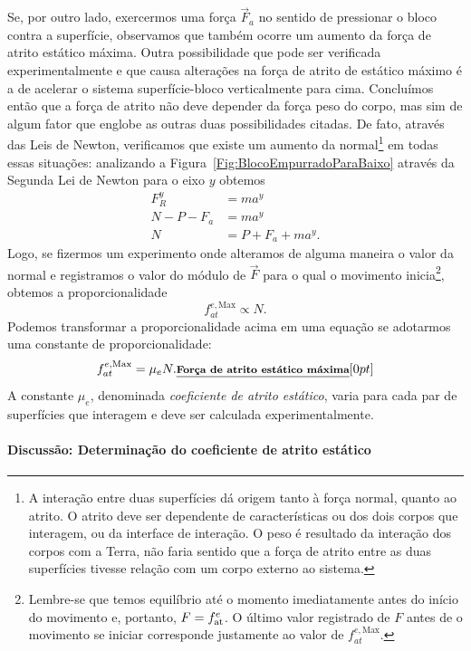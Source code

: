 Se, por outro lado, exercermos uma força $\vec{F}_a$ no sentido de pressionar o bloco contra a superfície, observamos que também ocorre um aumento da força de atrito estático máxima. Outra possibilidade que pode ser verificada experimentalmente e que causa alterações na força de atrito de estático máximo é a de acelerar o sistema superfície-bloco verticalmente para cima. Concluímos então que a força de atrito não deve depender da força peso do corpo, mas sim de algum fator que englobe as outras duas possibilidades citadas. De fato, através das Leis de Newton, verificamos  que existe um aumento da normal\footnote{A interação entre duas superfícies dá origem tanto à força normal, quanto ao atrito. O atrito deve ser dependente de características ou dos dois corpos que interagem, ou da interface de interação. O peso é resultado da interação dos corpos com a Terra, não faria sentido que a força de atrito entre as duas superfícies tivesse relação com um corpo externo ao sistema.} em todas essas situações: analizando a Figura~\ref{Fig:BlocoEmpurradoParaBaixo} através da Segunda Lei de Newton para o eixo $y$ obtemos
\begin{align}
    F_R^y &= m a^y \\
    N - P - F_a &= m a^y \\
    N &= P + F_a + m a^y.
\end{align}
%
Logo, se fizermos um experimento onde alteramos de alguma maneira o valor da normal e registramos o valor do módulo de $\vec{F}$ para o qual o movimento inicia\footnote{Lembre-se que temos equilíbrio até o momento imediatamente antes do início do movimento e, portanto, $F = f_{\rm{at}}^e$. O último valor registrado de $F$ antes de o movimento se iniciar corresponde justamente ao valor de $f_{at}^{e,\textrm{Max}}$.}, obtemos a proporcionalidade
\begin{equation}
    f_{at}^{e,\textrm{Max}} \propto N.
\end{equation}
%
Podemos transformar a proporcionalidade acima em uma equação se adotarmos uma constante de proporcionalidade:
\begin{equation}
    f_{at}^{e,\textrm{Max}} = \mu_e N. \relax{\footnotesize\emph{\textbf{Força de atrito estático máxima}}}[0pt]
\end{equation}
%
A constante $\mu_e$, denominada \emph{coeficiente de atrito estático}, varia para cada par de superfícies que interagem e deve ser calculada experimentalmente.

\paragraph{Discussão: Determinação do coeficiente de atrito estático}

